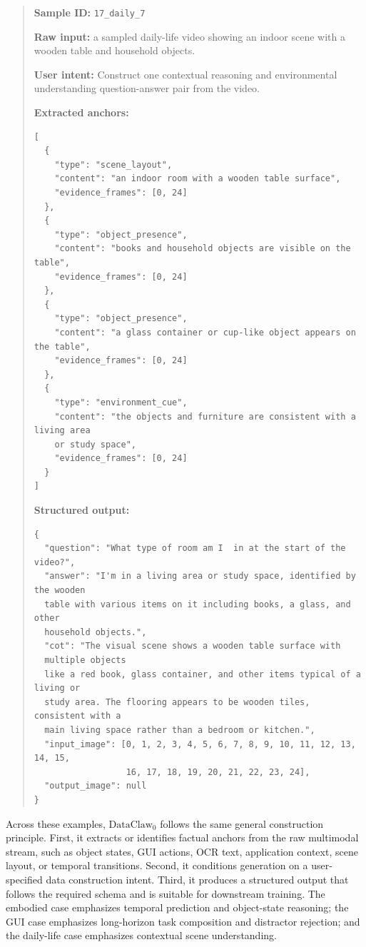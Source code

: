 \begin{quote}
\small
\textbf{Sample ID:} \texttt{17\_daily\_7}

\textbf{Raw input:} a sampled daily-life video showing an indoor scene with a wooden table and household objects.

\textbf{User intent:} Construct one contextual reasoning and environmental understanding question-answer pair from the video.

\textbf{Extracted anchors:}
\begin{verbatim}
[
  {
    "type": "scene_layout",
    "content": "an indoor room with a wooden table surface",
    "evidence_frames": [0, 24]
  },
  {
    "type": "object_presence",
    "content": "books and household objects are visible on the table",
    "evidence_frames": [0, 24]
  },
  {
    "type": "object_presence",
    "content": "a glass container or cup-like object appears on the table",
    "evidence_frames": [0, 24]
  },
  {
    "type": "environment_cue",
    "content": "the objects and furniture are consistent with a living area 
    or study space",
    "evidence_frames": [0, 24]
  }
]
\end{verbatim}

\textbf{Structured output:}
\begin{verbatim}
{
  "question": "What type of room am I  in at the start of the video?",
  "answer": "I'm in a living area or study space, identified by the wooden
  table with various items on it including books, a glass, and other 
  household objects.",
  "cot": "The visual scene shows a wooden table surface with
  multiple objects
  like a red book, glass container, and other items typical of a living or
  study area. The flooring appears to be wooden tiles, consistent with a 
  main living space rather than a bedroom or kitchen.",
  "input_image": [0, 1, 2, 3, 4, 5, 6, 7, 8, 9, 10, 11, 12, 13, 14, 15,
                  16, 17, 18, 19, 20, 21, 22, 23, 24],
  "output_image": null
}
\end{verbatim}
\end{quote}


Across these examples, $\text{DataClaw}_0$ follows the same general construction principle. First, it extracts or identifies factual anchors from the raw multimodal stream, such as object states, GUI actions, OCR text, application context, scene layout, or temporal transitions. Second, it conditions generation on a user-specified data construction intent. Third, it produces a structured output that follows the required schema and is suitable for downstream training. The embodied case emphasizes temporal prediction and object-state reasoning; the GUI case emphasizes long-horizon task composition and distractor rejection; and the daily-life case emphasizes contextual scene understanding. 

